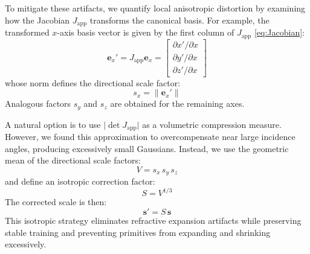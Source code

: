 To mitigate these artifacts, we quantify local anisotropic distortion by examining how the Jacobian $J_{\text{app}}$ transforms the canonical basis.  
For example, the transformed $x$-axis basis vector is given by the first column of $J_{\text{app}}$ \cref{eq:Jacobian}:
\begin{equation}
  \bm{e}_x'=
  J_{\text{app}}\bm{e}_x=
    \begin{bmatrix}
        \partial x'/\partial x \\
        \partial y'/\partial x \\
        \partial z'/\partial x
    \end{bmatrix}
\end{equation}
whose norm defines the directional scale factor:
\begin{equation}
  s_x=\|\bm{e}_x'\|
\end{equation}
Analogous factors $s_y$ and $s_z$ are obtained for the remaining axes.


A natural option is to use $\lvert\det J_{\text{app}}\rvert$ as a volumetric
compression measure.
However, we found this approximation to overcompensate near large incidence angles, producing excessively small Gaussians.  
Instead, we use the geometric mean of the directional scale factors:
\begin{equation}
  V=s_x\,s_y\,s_z
  \label{eq:volume-compression-ratio}
\end{equation}
and define an isotropic correction factor:
\begin{equation}
  S = V^{1/3}
  \label{scale-correction-factor}
\end{equation}
The corrected scale is then:
\begin{equation}
  \bm{s}' = S\,\bm{s}
  \label{eq:scale-correction-edge}
\end{equation}
This isotropic strategy eliminates refractive expansion artifacts while
preserving stable training and preventing primitives from expanding and shrinking excessively.
